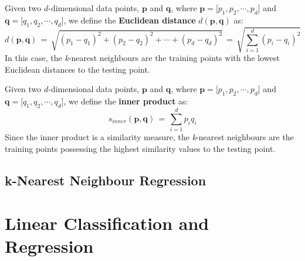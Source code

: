 \documentclass[11pt,fleqn]{book} %
\begin{document}

\begin{definition}
Given two $d$-dimensional data points, $\mathbf{p}$ and $\mathbf{q}$, where $\mathbf{p}= \big[p_1, p_2, \cdots, p_d\big]$ and $\mathbf{q} = \big[q_1, q_2, \cdots, q_d\big]$, we define the \textbf{Euclidean distance} $d(\mathbf{p},\mathbf{q})$ as:
\begin{equation*}
	d(\mathbf{p},\mathbf{q}) \, = \, \sqrt{(p_1 - q_1)^2 + (p_2 - q_2)^2 + \cdots + (p_d - q_d)^2} \, = \, \sqrt{\sum^d_{i=1}(p_i - q_i)^2}
\end{equation*}
In this case, the \textit{k}-nearest neighbours are the training points with the lowest Euclidean distances to the testing point.
\end{definition}

\begin{definition}
Given two $d$-dimensional data points, $\mathbf{p}$ and $\mathbf{q}$, where $\mathbf{p}= \big[p_1, p_2, \cdots, p_d\big]$ and $\mathbf{q} = \big[q_1, q_2, \cdots, q_d\big]$, we define the \textbf{inner product} as:
\begin{equation*}
	s_{inner}(\mathbf{p},\mathbf{q}) \, = \, \sum^d_{i=1}p_iq_i
\end{equation*}
Since the inner product is a similarity measure, the \textit{k}-nearest neighbours are the training points possessing the highest similarity values to the testing point.
\end{definition}

\section{k-Nearest Neighbour Regression}




\chapter{Linear Classification and Regression}
\end{document}
